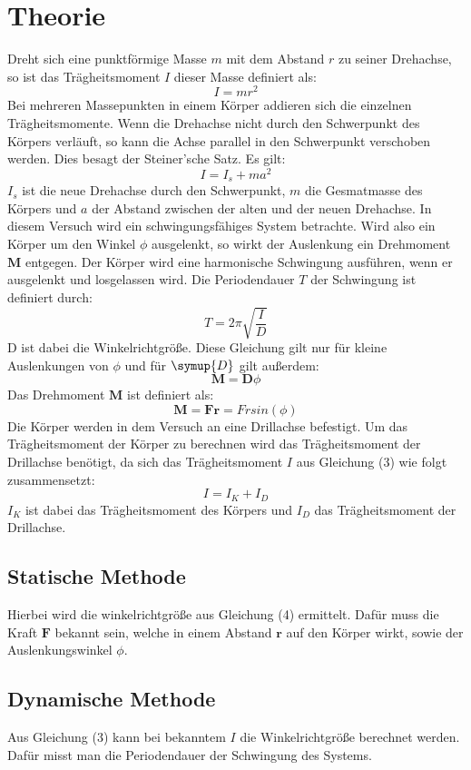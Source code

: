 \section{Theorie}
\label{sec:Theorie}

\cite{sample}
Dreht sich eine punktförmige Masse $m$ mit dem Abstand $r$ zu seiner Drehachse, so
ist das Trägheitsmoment $I$ dieser Masse definiert als:
\begin{equation}
  I = m r^2
\end{equation}
Bei mehreren Massepunkten in einem Körper addieren sich die einzelnen
Trägheitsmomente.
Wenn die Drehachse nicht durch den Schwerpunkt des Körpers verläuft, so kann
die Achse parallel in den Schwerpunkt verschoben werden. Dies besagt der Steiner'sche
Satz. Es gilt:
\begin{equation}
  I = I_s + m a^2
\end{equation}
$I_s$ ist die neue Drehachse durch den Schwerpunkt, $m$ die Gesmatmasse
des Körpers und $a$ der Abstand zwischen der alten und der neuen Drehachse.
In diesem Versuch wird ein schwingungsfähiges System betrachte. Wird also ein Körper
um den Winkel $\phi$ ausgelenkt, so wirkt der Auslenkung ein Drehmoment $\symbf{M}$ entgegen.
Der Körper wird eine harmonische Schwingung ausführen, wenn er ausgelenkt und
losgelassen wird. Die Periodendauer $T$ der Schwingung ist definiert durch:
\begin{equation}
  T = 2 \pi \sqrt{\frac{I}{D}}
\end{equation}
D ist dabei die Winkelrichtgröße. Diese Gleichung gilt nur für
kleine Auslenkungen von $\phi$ und für $\symup{D}$ gilt außerdem:
\begin{equation}
  \symbf{M} = \symbf{D} \phi
\end{equation}
Das Drehmoment $\symbf{M}$ ist definiert als:
\begin{equation}
  \symbf{M} = \symbf{F}{\symbf{r}} = F r sin(\phi)
\end{equation}
Die Körper werden in dem Versuch an eine Drillachse befestigt. Um das Trägheitsmoment
der Körper zu berechnen wird das Trägheitsmoment der Drillachse benötigt, da sich
das Trägheitsmoment $I$ aus Gleichung (3) wie folgt zusammensetzt:
\begin{equation}
  I = I_K + I_D
\end{equation}
$I_K$ ist dabei das Trägheitsmoment des Körpers und $I_D$ das
Trägheitsmoment der Drill\-achse.
\subsection{Statische Methode}
Hierbei wird die winkelrichtgröße aus Gleichung (4) ermittelt. Dafür muss die
Kraft $\symbf{F}$ bekannt sein, welche in einem Abstand $\symbf{r}$ auf den Körper wirkt,
sowie der Auslenkungswinkel $\phi$.
\subsection{Dynamische Methode}
Aus Gleichung (3) kann bei bekanntem $I$ die Winkelrichtgröße berechnet werden. Dafür
misst man die Periodendauer der Schwingung des Systems.
